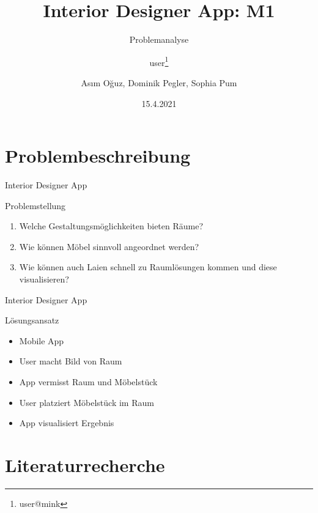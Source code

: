 \documentclass[presentation,bigger,aspectratio=169]{beamer}
\author{user\thanks{user@mink}}
\date{15.4.2021}
\title{Interior Designer App: M1}
\subtitle{Problemanalyse}
\author[A.Oğuz, D.Pegler, S.Pum]{Asım Oğuz, Dominik Pegler, Sophia Pum}
\institute{Universität Wien, Fakultät für Informatik (SS2021)}
\begin{document}
\maketitle

\section{Problembeschreibung}
\label{sec:org248f8cd}
\begin{frame}[label={sec:orgca8b747}]{\vspace{2.2cm}\begin{center}\MakeUppercase{\insertsection}\end{center}}
\end{frame}

\begin{frame}[label={sec:org0be9153}]{Interior Designer App}
\begin{block}{Problemstellung}
\begin{enumerate}
\item Welche Gestaltungsmöglichkeiten bieten Räume?
\item Wie können Möbel sinnvoll angeordnet werden?
\item Wie können auch Laien schnell zu Raumlösungen kommen und diese
visualisieren?
\end{enumerate}
\end{block}
\end{frame}
\begin{frame}[label={sec:orge9b9007}]{Interior Designer App}
\begin{block}{Lösungsansatz}
\begin{itemize}
\item Mobile App
\item User macht Bild von Raum
\item App vermisst Raum und Möbelstück
\item User platziert Möbelstück im Raum
\item App visualisiert Ergebnis
\end{itemize}
\end{block}
\end{frame}

\section{Literaturrecherche}
\label{sec:orgb4b2a70}
\begin{frame}[label={sec:org4463e93}]{\vspace{2.2cm}\begin{center}\MakeUppercase{\insertsection}\end{center}}
\end{frame}
\end{document}
